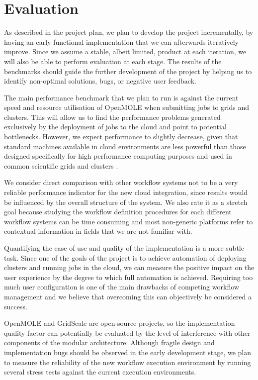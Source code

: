 \chapter{Evaluation}


As described in the project plan, we plan to develop the project incrementally, by having an early functional implementation that we can afterwards iteratively improve. Since we assume a stable, albeit limited, product at each iteration, we will also be able to perform evaluation at each stage. The results of the benchmarks should guide the further development of the project by helping us to identify non-optimal solutions, bugs, or negative user feedback.

The main performance benchmark that we plan to run is against the current speed and resource utilisation of OpenMOLE when submitting jobs to grids and clusters. This will allow us to find the performance problems generated exclusively by the deployment of jobs to the cloud and point to potential bottlenecks. However, we expect performance to slightly decrease, given that standard machines available in cloud environments are less powerful than those designed specifically for high performance computing purposes and used in common scientific grids and clusters \cite{Juve2009}.

We consider direct comparison with other workflow systems not to be a very reliable performance indicator for the new cloud integration, since results would be influenced by the overall structure of the system. We also rate it as a stretch goal because studying the workflow definition procedures for each different workflow systems can be time consuming and most non-generic platforms refer to contextual information in fields that we are not familiar with.

Quantifying the ease of use and quality of the implementation is a more subtle task. Since one of the goals of the project is to achieve automation of deploying clusters and running jobs in the cloud, we can measure the positive impact on the user experience by the degree to which full automation is achieved. Requiring too much user configuration is one of the main drawbacks of competing workflow management and we believe that overcoming this can objectively be considered a success.

OpenMOLE and GridScale are open-source projects, so the implementation quality factor can potentially be evaluated by the level of interference with other components of the modular architecture. Although fragile design and implementation bugs should be observed in the early development stage, we plan to measure the reliability of the new workflow execution environment by running several stress tests against the current execution environments.